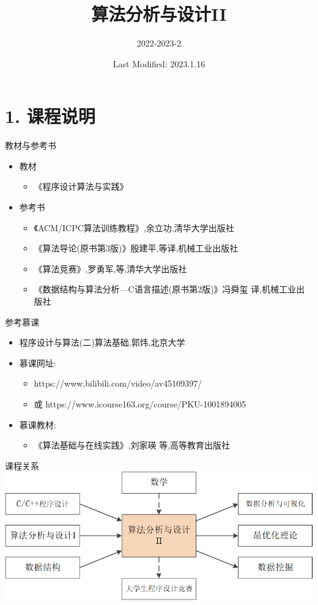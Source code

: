 \documentclass{beamer}
\title{算法分析与设计II}
\subtitle{2022-2023-2}
\date{Last Modified: 2023.1.16}
\institute{\vspace{2em} 数学与计算机学院 \\ 数据科学与大数据技术}
\begin{document}
\frame{\titlepage}

\section{1. 课程说明}
\begin{frame}{教材与参考书}
    \begin{itemize}
        \item 教材
        \begin{itemize}
            \item《程序设计算法与实践》
        \end{itemize}
        \item 参考书
        \begin{itemize}
            \item 《ACM/ICPC算法训练教程》,余立功,清华大学出版社
            \item 《算法导论(原书第3版)》殷建平,等译,机械工业出版社
            \item 《算法竞赛》,罗勇军,等,清华大学出版社
            \item 《数据结构与算法分析—C语言描述(原书第2版)》冯舜玺 译,机械工业出版社
        \end{itemize}
    \end{itemize}
\end{frame}
\begin{frame}{参考慕课}
    \begin{itemize}
        \item 程序设计与算法(二)算法基础,郭炜,北京大学
        \item 慕课网址:
        \begin{itemize}
            \item https://www.bilibili.com/video/av45109397/
            \item 或 https://www.icourse163.org/course/PKU-1001894005
        \end{itemize}
        \item 慕课教材:
        \begin{itemize}
            \item 《算法基础与在线实践》,刘家瑛 等,高等教育出版社
        \end{itemize}
    \end{itemize}
\end{frame}
\begin{frame}{课程关系}
    \includegraphics[scale=0.7]{fig/1-1.png}
\end{frame}
\end{document}
